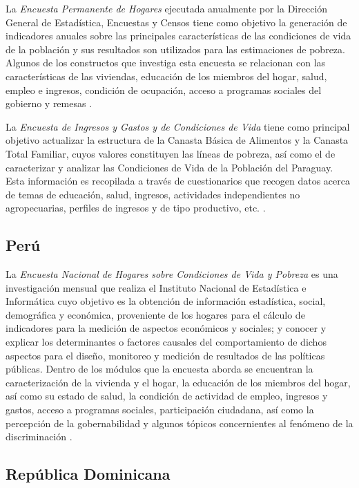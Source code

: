 \documentclass[
  12pt,
]{book}
\begin{document}
La \emph{Encuesta Permanente de Hogares} ejecutada anualmente por la Dirección General de Estadística, Encuestas y Censos tiene como objetivo la generación de indicadores anuales sobre las principales características de las condiciones de vida de la población y sus resultados son utilizados para las estimaciones de pobreza. Algunos de los constructos que investiga esta encuesta se relacionan con las características de las viviendas, educación de los miembros del hogar, salud, empleo e ingresos, condición de ocupación, acceso a programas sociales del gobierno y remesas \citep{DGEEC-PY}.

La \emph{Encuesta de Ingresos y Gastos y de Condiciones de Vida} tiene como principal objetivo actualizar la estructura de la Canasta Básica de Alimentos y la Canasta Total Familiar, cuyos valores constituyen las líneas de pobreza, así como el de caracterizar y analizar las Condiciones de Vida de la Población del Paraguay. Esta información es recopilada a través de cuestionarios que recogen datos acerca de temas de educación, salud, ingresos, actividades independientes no agropecuarias, perfiles de ingresos y de tipo productivo, etc. \citep{DGEEC2-PY}.

\hypertarget{peruxfa}{%
\subsection{Perú}\label{peruxfa}}

La \emph{Encuesta Nacional de Hogares sobre Condiciones de Vida y Pobreza} es una investigación mensual que realiza el Instituto Nacional de Estadística e Informática cuyo objetivo es la obtención de información estadística, social, demográfica y económica, proveniente de los hogares para el cálculo de indicadores para la medición de aspectos económicos y sociales; y conocer y explicar los determinantes o factores causales del comportamiento de dichos aspectos para el diseño, monitoreo y medición de resultados de las políticas públicas. Dentro de los módulos que la encuesta aborda se encuentran la caracterización de la vivienda y el hogar, la educación de los miembros del hogar, así como su estado de salud, la condición de actividad de empleo, ingresos y gastos, acceso a programas sociales, participación ciudadana, así como la percepción de la gobernabilidad y algunos tópicos concernientes al fenómeno de la discriminación \citep{INEI-PE_2016}.

\hypertarget{repuxfablica-dominicana}{%
\subsection{República Dominicana}\label{repuxfablica-dominicana}}
\end{document}
